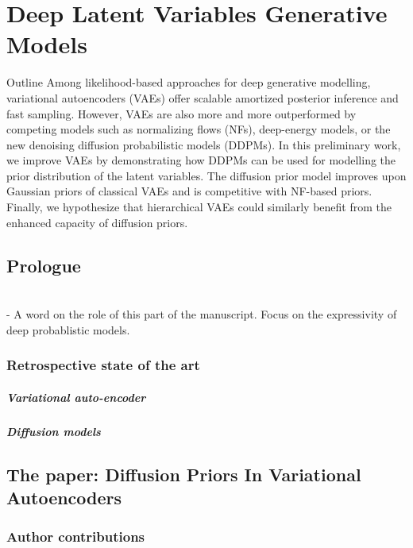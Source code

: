 \chapter{Deep Latent Variables Generative Models}\label{ch:03}

\begin{remark}{Outline}
Among likelihood-based approaches for deep generative modelling, variational autoencoders (VAEs) offer scalable amortized posterior inference and fast sampling. However, VAEs are also more and more outperformed by competing models such as normalizing flows (NFs), deep-energy models, or the new denoising diffusion probabilistic models (DDPMs).
In this preliminary work, we improve VAEs by demonstrating how DDPMs can be used for modelling the prior distribution of the latent variables. The diffusion prior model improves upon Gaussian priors of classical VAEs and is competitive with NF-based priors.
Finally, we hypothesize that hierarchical VAEs could similarly benefit from the enhanced capacity of diffusion priors.
\end{remark}
\section{Prologue}
\\
- A word on the role of this part of the manuscript. Focus on the expressivity of deep probablistic models.

\subsection{Retrospective state of the art}

\paragraph{Variational auto-encoder}

\paragraph{Diffusion models}

\section{The paper: Diffusion Priors In Variational Autoencoders}

\subsection{Author contributions}

